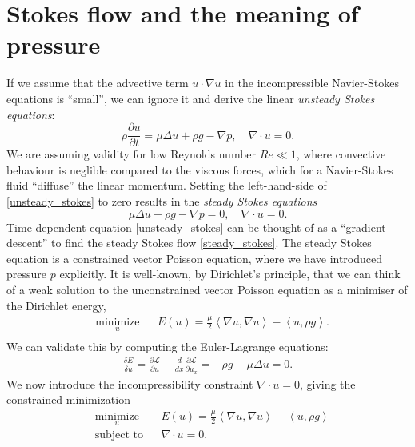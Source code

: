 \documentclass[11pt,a4paper]{memoir}
\newcommand{\inner}[1]{\left<#1\right>}
\newcommand{\fancyL}{\mathcal{L}}
\newcommand{\Part}[2]{\frac{\partial #1}{\partial #2}}
\begin{document}
\section{Stokes flow and the meaning of pressure}\label{pressure_derivation}
If we assume that the advective term $u\cdot \nabla u$ in the incompressible Navier-Stokes equations is ``small'',
we can ignore it and derive the linear \textit{unsteady Stokes equations}:
\begin{equation}\label{unsteady_stokes}
    \rho\Part{u}{t} = \mu\Delta u + \rho g - \nabla p, \quad \nabla\cdot u = 0.
\end{equation}
We are assuming validity for low Reynolds number $Re \ll 1$, where convective behaviour is neglible compared to the viscous forces, which for a
Navier-Stokes fluid ``diffuse'' the linear momentum. Setting the left-hand-side of \eqref{unsteady_stokes} to zero results in the \textit{steady Stokes equations}
\begin{equation}\label{steady_stokes}
    \mu\Delta u + \rho g - \nabla p = 0,\quad \nabla\cdot u = 0.
\end{equation}
Time-dependent equation \eqref{unsteady_stokes} can be thought of as a ``gradient descent'' to find the steady Stokes flow \eqref{steady_stokes}.
The steady Stokes equation is a constrained vector Poisson equation, where we have introduced pressure $p$ explicitly.
It is well-known, by Dirichlet's principle, that we can think
of a weak solution to the unconstrained vector Poisson equation as a minimiser of the Dirichlet energy,
\begin{equation}
\begin{aligned}
& \underset{u}{\text{minimize}}
& & E(u) =  \frac{\mu}{2} \inner{\nabla u, \nabla u} - \inner{u, \rho g}.\\
\end{aligned}
\end{equation}
\newcommand{\energygradient}{\frac{\delta E}{\delta u}}
We can validate this by computing the Euler-Lagrange equations:
\begin{align*}
    \frac{\delta E}{\delta u} = \Part{\fancyL}{u} - \frac{d}{dx}\Part{\fancyL}{u_x}
                              = -\rho g - \mu\Delta u = 0.
\end{align*}
We now introduce the incompressibility constraint $\nabla \cdot u = 0$, giving the constrained minimization
\begin{equation}\label{stokes_flow_optimization}
\begin{aligned}
& \underset{u}{\text{minimize}}
& & E(u) =  \frac{\mu}{2} \inner{\nabla u, \nabla u} - \inner{u, \rho g}\\
& \text{subject to}
& & \nabla\cdot u = 0.
\end{aligned}
\end{equation}
\end{document}
